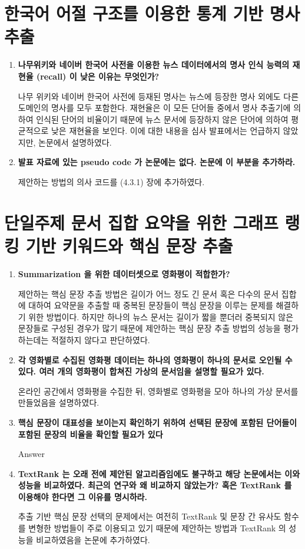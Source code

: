 \documentclass[11pt]{article}
\begin{document}
\section{한국어 어절 구조를 이용한 통계 기반 명사 추출}
\begin{enumerate}
\item \textbf{나무위키와 네이버 한국어 사전을 이용한 뉴스 데이터에서의 명사 인식 능력의 재현율 (recall) 이 낮은 이유는 무엇인가?}

나무 위키와 네이버 한국어 사전에 등재된 명사는 뉴스에 등장한 명사 외에도 다른 도메인의 명사를 모두 포함한다.
재현율은 이 모든 단어들 중에서 명사 추출기에 의하여 인식된 단어의 비율이기 때문에 뉴스 문서에 등장하지 않은 단어에 의하여 평균적으로 낮은 재현율을 보인다. 
이에 대한 내용을 심사 발표에서는 언급하지 않았지만, 논문에서 설명하였다.

\item \textbf{발표 자료에 있는 pseudo code 가 논문에는 없다. 논문에 이 부분을 추가하라.}

제안하는 방법의 의사 코드를 (4.3.1) 장에 추가하였다.

\end{enumerate}


\section{단일주제 문서 집합 요약을 위한 그래프 랭킹 기반 키워드와 핵심
문장 추출}
\begin{enumerate}
\item \textbf{Summarization 을 위한 데이터셋으로 영화평이 적합한가?}

제안하는 핵심 문장 추출 방법은 길이가 어느 정도 긴 문서 혹은 다수의 문서 집합에 대하여 요약문을 추출할 때 중복된 문장들이 핵심 문장을 이루는 문제를 해결하기 위한 방법이다.
하지만 하나의 뉴스 문서는 길이가 짧을 뿐더러 중복되지 않은 문장들로 구성된 경우가 많기 때문에 제안하는 핵심 문장 추출 방법의 성능을 평가하는데는 적절하지 않다고 판단하였다.

\item \textbf{각 영화별로 수집된 영화평 데이터는 하나의 영화평이 하나의 문서로 오인될 수 있다. 여러 개의 영화평이 합쳐진 가상의 문서임을 설명할 필요가 있다.}

온라인 공간에서 영화평을 수집한 뒤, 영화별로 영화평을 모아 하나의 가상 문서를 만들었음을 설명하였다.

\item \textbf{핵심 문장이 대표성을 보이는지 확인하기 위하여 선택된 문장에 포함된 단어들이 포함된 문장의 비율을 확인할 필요가 있다}

Answer


\item \textbf{TextRank 는 오래 전에 제안된 알고리즘임에도 불구하고 해당 논문에서는 이와 성능을 비교하였다. 최근의 연구와 왜 비교하지 않았는가? 혹은 TextRank 를 이용해야 한다면 그 이유를 명시하라.}

추출 기반 핵심 문장 선택의 문제에서는 여전히 TextRank 및 문장 간 유사도 함수를 변형한 방법들이 주로 이용되고 있기 때문에 제안하는 방법과 TextRank 의 성능을 비교하였음을 논문에 추가하였다.

\end{enumerate}
\end{document}
